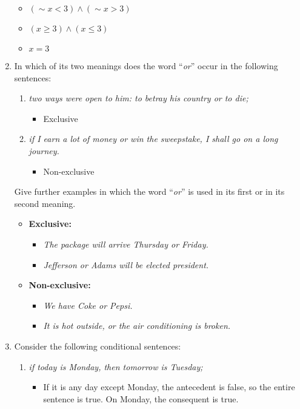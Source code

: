 \begin{enumerate}
\begin{itemize}
  \item $(\sim x<3) \wedge (\sim x>3)$
  \item $(x \ge 3) \wedge (x \le 3)$
  \item $x = 3$
  \end{itemize}
\item In which of its two meanings does the word ``\emph{or}'' occur in the
  following sentences:
  \begin{enumerate}
  \item \emph{two ways were open to him: to betray his country or to
    die;}
    \begin{itemize}
    \item Exclusive
    \end{itemize}
  \item \emph{if I earn a lot of money or win the sweepstake, I shall
    go on a long journey.}
    \begin{itemize}
    \item Non-exclusive
    \end{itemize}
  \end{enumerate}
  Give further examples in which the word ``\emph{or}'' is used in its first
  or in its second meaning.
  \begin{itemize}
  \item \textbf{Exclusive:}
    \begin{itemize}
    \item \emph{The package will arrive Thursday or Friday.}
    \item \emph{Jefferson or Adams will be elected president.}
    \end{itemize}
  \item \textbf{Non-exclusive:}
    \begin{itemize}
    \item \emph{We have Coke or Pepsi.}
    \item \emph{It is hot outside, or the air conditioning is broken.}
    \end{itemize}
  \end{itemize}
\item Consider the following conditional sentences:
  \begin{enumerate}
  \item \emph{if today is Monday, then tomorrow is Tuesday;}
    \begin{itemize}
    \item If it is any day except Monday, the antecedent is false, so
      the entire sentence is true.  On Monday, the consequent is true.

\end{itemize}
\end{enumerate}
\end{enumerate}

